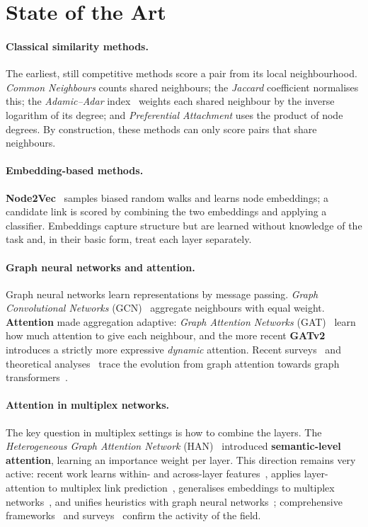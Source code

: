 \documentclass[11pt,a4paper]{article}
\begin{document}
\section{State of the Art}

\paragraph{Classical similarity methods.}
The earliest, still competitive methods score a pair from its local neighbourhood. \emph{Common
Neighbours} counts shared neighbours; the \emph{Jaccard} coefficient normalises this; the
\emph{Adamic--Adar} index~\cite{adamic2003} weights each shared neighbour by the inverse logarithm
of its degree; and \emph{Preferential Attachment} uses the product of node degrees. By construction,
these methods can only score pairs that share neighbours.

\paragraph{Embedding-based methods.}
\textbf{Node2Vec}~\cite{node2vec} samples biased random walks and learns node embeddings; a candidate
link is scored by combining the two embeddings and applying a classifier. Embeddings capture
structure but are learned without knowledge of the task and, in their basic form, treat each layer
separately.

\paragraph{Graph neural networks and attention.}
Graph neural networks learn representations by message passing. \emph{Graph Convolutional Networks}
(GCN)~\cite{gcn} aggregate neighbours with equal weight. \textbf{Attention} made aggregation
adaptive: \emph{Graph Attention Networks} (GAT)~\cite{gat} learn how much attention to give each
neighbour, and the more recent \textbf{GATv2}~\cite{gatv2} introduces a strictly more expressive
\emph{dynamic} attention. Recent surveys~\cite{attnsurvey2023} and theoretical
analyses~\cite{gatretro2023} trace the evolution from graph attention towards graph
transformers~\cite{gtsurvey2024}.

\paragraph{Attention in multiplex networks.}
The key question in multiplex settings is how to combine the layers. The \emph{Heterogeneous Graph
Attention Network} (HAN)~\cite{han2019} introduced \textbf{semantic-level attention}, learning an
importance weight per layer. This direction remains very active: recent work learns within- and
across-layer features~\cite{zangari2024}, applies layer-attention to multiplex link
prediction~\cite{mdpi2025}, generalises embeddings to multiplex
networks~\cite{multiplexsage2024}, and unifies heuristics with graph neural
networks~\cite{heuristickdd2024}; comprehensive frameworks~\cite{framework2024} and
surveys~\cite{survey2025} confirm the activity of the field.
\end{document}
